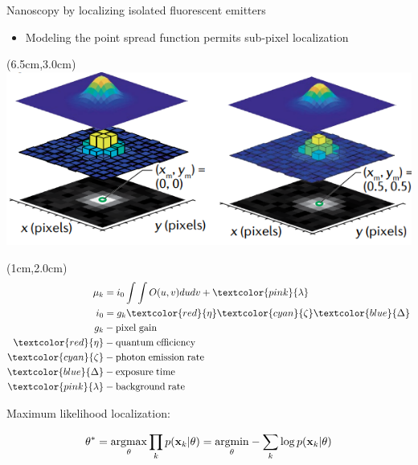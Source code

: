 \documentclass{beamer}					%
\begin{document}
\begin{frame}{Nanoscopy by localizing isolated fluorescent emitters}
\begin{itemize}
\item Modeling the point spread function permits sub-pixel localization 
\end{itemize}
\begin{textblock*}{8cm}(6.5cm,3.0cm)
\includegraphics[width=\textwidth]{../../phd/dissertation/dissertation/media/Model.png}
\end{textblock*}

\begin{textblock*}{2cm}(1cm,2.0cm)
\begin{align*}
\mu_{k} &= i_{0}\int\int O(u,v)dudv + \textcolor{pink}{\lambda}\\
i_{0} &= g_{k}\textcolor{red}{\eta} \textcolor{cyan}{\zeta}\textcolor{blue}{\Delta} 
\\
g_{k} &- \mathrm{pixel\; gain}\\
\textcolor{red}{\eta} &- \mathrm{quantum\; efficiency}\\
\textcolor{cyan}{\zeta} &- \mathrm{photon\; emission\; rate}\\
\textcolor{blue}{\Delta} &- \mathrm{exposure\; time}\\
\textcolor{pink}{\lambda} &- \mathrm{background \; rate}
\end{align*}
\end{textblock*}

\vspace{2in}

Maximum likelihood localization:

\begin{equation*}
\theta^{*} = \underset{\theta}{\mathrm{argmax}}\prod_{k}p(\bold{x}_{k}|\theta)= \underset{\theta}{\mathrm{argmin}}-\sum_{k}\log p(\bold{x}_{k}|\theta)
\end{equation*}

\end{frame}
\end{document}
